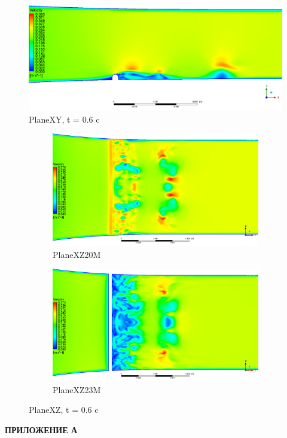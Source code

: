 \appendix
{}
\setcounter{figure}{0}
\begin{figure}[H]
	\centering
	\includegraphics[width=0.9\linewidth]{../Assets/T0_Velocity_ContourXY}
	\caption{PlaneXY, t = 0.6 c}
	\label{fig:t0velocitycontourxy}
\end{figure}
\begin{figure}[H]
	\begin{subfigure}{.5\textwidth}
		\centering
		\includegraphics[width=1.7\linewidth, angle=90]{../Assets/T0_Velocity_ContourXZ20M}
		\caption{PlaneXZ20M}
		\label{fig:t0velocitycontourxz20m}
	\end{subfigure}%
	\begin{subfigure}{.5\textwidth}
		\centering
		\includegraphics[width=1.7\linewidth, angle=90]{../Assets/T0_Velocity_ContourXZ23M}
		\caption{PlaneXZ23M}
		\label{fig:t0velocitycontourxz23m}
	\end{subfigure}
		\caption{PlaneXZ, t = 0.6 c}
		\label{fig:t0velocitycontourxz}
\end{figure}
\newpage
\begin{flushright}
	\MakeUppercase{\textbf{Приложение А}}
\end{flushright}